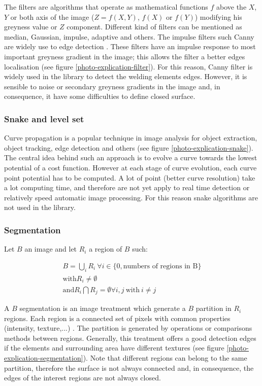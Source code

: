 \documentclass[12pt]{iopart}
\begin{document}
The filters are algorithms that operate as mathematical functions $f$ above the 
$X$, $Y$ or both axis of the image ($Z = f(X,Y)$,  
$f(X)$ or $f(Y)$)  modifying his greyness value or $Z$ component. 
Different kind of filters can be mentioned as median, Gaussian, impulse,
 adaptive and others. The impulse filters such Canny are 
widely use to edge detection \cite{COCQUEREZ}. These filters have an
 impulse response to most important greyness gradient in the 
image; this allows the filter a better edges localisation
 (see figure \ref{photo-explication-filter}). 
For this reason, Canny filter is widely 
used in the library to detect the welding elements edges. 
However, it is sensible to noise or secondary greyness gradients in the image
 and, in consequence, it have some difficulties to define closed surface.

\subsubsection{Snake and level set}
\label{snake-and-level-set}
 
Curve propagation is a popular technique in image analysis for object extraction,
 object tracking, edge detection and others (see figure 
\ref{photo-explication-snake}). The central idea behind such an approach
 is to evolve a curve towards the lowest potential of a cost function. 
However at each stage of curve evolution, each curve point potential has
 to be computed. A lot of point (better curve resolution) take a lot 
computing time, and therefore are not yet apply to real time detection
 or relatively speed automatic image processing. For this reason snake algorithms are not used in the library.

\subsubsection{Segmentation}
\label{segmentation}

Let $B$ an image and let $R_{i}$ a region of $B$ such:

\begin{eqnarray}
B = \bigcup_{i}R_{i}\ \forall i \in \{0, \mbox{numbers of regions in B}\} \\
\mbox{with} R_{i} \neq \emptyset \\
\mbox{and}  R_{i}\bigcap R_{j} = \emptyset  \forall i, j\ \mbox{with}\ i \neq j\ 
\label{equation-segmentation}
\end{eqnarray}

A $B$ segmentation is an image treatment which generate a $B$ partition in $R_{i}$ regions. 
Each region is a connected set of pixels with 
common properties (intensity, texture,...) \cite{COCQUEREZ}.
 The partition is generated by operations or comparisons methods between 
regions. Generally, this treatment offers a good detection edges if
 the elements and surrounding area have different textures (see figure
 \ref{photo-explication-segmentation}). 
Note that different regions can belong to the same partition,
 therefore the surface is not always connected and,
 in consequence, the edges of the interest regions are not always closed.
\end{document}
